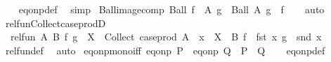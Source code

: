 \begin{isabellebody}
\isadelimproof
\ \ %
\endisadelimproof
%
\isatagproof
{}\isamarkupfalse%
\ eq{\isacharunderscore}{\kern0pt}onp{\isacharunderscore}{\kern0pt}def\ \isamarkupfalse%
\ simp%
\endisatagproof
{\isafoldproof}%
%
\isadelimproof
\isanewline
%
\endisadelimproof
\isanewline
{}\isamarkupfalse%
\ Ball{\isacharunderscore}{\kern0pt}image{\isacharunderscore}{\kern0pt}comp{\isacharcolon}{\kern0pt}\ {\isachardoublequoteopen}Ball\ {\isacharparenleft}{\kern0pt}f\ {\isacharbackquote}{\kern0pt}\ A{\isacharparenright}{\kern0pt}\ g\ {\isacharequal}{\kern0pt}\ Ball\ A\ {\isacharparenleft}{\kern0pt}g\ {\isasymcirc}\ f{\isacharparenright}{\kern0pt}{\isachardoublequoteclose}\isanewline
%
\isadelimproof
\ \ %
\endisadelimproof
%
\isatagproof
{}\isamarkupfalse%
\ auto%
\endisatagproof
{\isafoldproof}%
%
\isadelimproof
\isanewline
%
\endisadelimproof
\isanewline
{}\isamarkupfalse%
\ rel{\isacharunderscore}{\kern0pt}fun{\isacharunderscore}{\kern0pt}Collect{\isacharunderscore}{\kern0pt}case{\isacharunderscore}{\kern0pt}prodD{\isacharcolon}{\kern0pt}\isanewline
\ \ {\isachardoublequoteopen}rel{\isacharunderscore}{\kern0pt}fun\ A\ B\ f\ g\ {\isasymLongrightarrow}\ X\ {\isasymsubseteq}\ Collect\ {\isacharparenleft}{\kern0pt}case{\isacharunderscore}{\kern0pt}prod\ A{\isacharparenright}{\kern0pt}\ {\isasymLongrightarrow}\ x\ {\isasymin}\ X\ {\isasymLongrightarrow}\ B\ {\isacharparenleft}{\kern0pt}{\isacharparenleft}{\kern0pt}f\ {\isasymcirc}\ fst{\isacharparenright}{\kern0pt}\ x{\isacharparenright}{\kern0pt}\ {\isacharparenleft}{\kern0pt}{\isacharparenleft}{\kern0pt}g\ {\isasymcirc}\ snd{\isacharparenright}{\kern0pt}\ x{\isacharparenright}{\kern0pt}{\isachardoublequoteclose}\isanewline
%
\isadelimproof
\ \ %
\endisadelimproof
%
\isatagproof
{}\isamarkupfalse%
\ rel{\isacharunderscore}{\kern0pt}fun{\isacharunderscore}{\kern0pt}def\ \isamarkupfalse%
\ auto%
\endisatagproof
{\isafoldproof}%
%
\isadelimproof
\isanewline
%
\endisadelimproof
\isanewline
{}\isamarkupfalse%
\ eq{\isacharunderscore}{\kern0pt}onp{\isacharunderscore}{\kern0pt}mono{\isacharunderscore}{\kern0pt}iff{\isacharcolon}{\kern0pt}\ {\isachardoublequoteopen}eq{\isacharunderscore}{\kern0pt}onp\ P\ {\isasymle}\ eq{\isacharunderscore}{\kern0pt}onp\ Q\ {\isasymlongleftrightarrow}\ P\ {\isasymle}\ Q{\isachardoublequoteclose}\isanewline
%
\isadelimproof
\ \ %
\endisadelimproof
%
\isatagproof
{}\isamarkupfalse%
\ eq{\isacharunderscore}{\kern0pt}onp{\isacharunderscore}{\kern0pt}def\ \isamarkupfalse%

\end{isabellebody}
